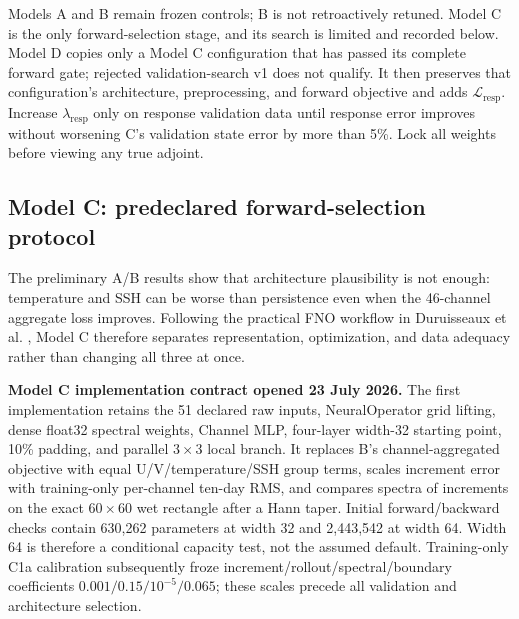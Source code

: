 \documentclass[11pt]{article}
\newenvironment{decisionbox}
  {\begin{center}\begin{lrbox}{\decisionstore}\begin{minipage}{0.92\textwidth}}
  {\end{minipage}\end{lrbox}\setlength{\fboxsep}{8pt}%
   \fcolorbox{teal}{lightteal}{\usebox{\decisionstore}}\end{center}}
\begin{document}
Models A and B remain frozen controls; B is not retroactively retuned.  Model C is the
only forward-selection stage, and its search is limited and recorded below.  Model D
copies only a Model C configuration that has passed its complete forward gate; rejected
validation-search v1 does not qualify.  It then preserves that configuration's
architecture, preprocessing, and forward objective and adds
\(\mathcal{L}_{\mathrm{resp}}\).  Increase \(\lambda_{\mathrm{resp}}\) only on response
validation data until response error improves without worsening C's validation state
error by more than 5\%.  Lock all weights before viewing any true adjoint.

\subsection{Model C: predeclared forward-selection protocol}

The preliminary A/B results show that architecture plausibility is not enough:
temperature and SSH can be worse than persistence even when the 46-channel aggregate
loss improves.  Following the practical FNO workflow in Duruisseaux et al.
\cite{Duruisseaux2026}, Model C therefore separates representation, optimization, and
data adequacy rather than changing all three at once.

\begin{decisionbox}
\textbf{Model C implementation contract opened 23 July 2026.}  The first implementation
retains the 51 declared raw inputs, NeuralOperator grid lifting, dense float32 spectral
weights, Channel MLP, four-layer width-32 starting point, 10\% padding, and parallel
\(3\times3\) local branch.  It replaces B's channel-aggregated objective with equal
U/V/temperature/SSH group terms, scales increment error with training-only per-channel
ten-day RMS, and compares spectra of increments on the exact \(60\times60\) wet
rectangle after a Hann taper.  Initial forward/backward checks contain 630,262
parameters at width 32 and 2,443,542 at width 64.  Width 64 is therefore a conditional
capacity test, not the assumed default.  Training-only C1a calibration subsequently
froze increment/rollout/spectral/boundary coefficients
\(0.001/0.15/10^{-5}/0.065\); these scales precede all validation and architecture
selection.
\end{decisionbox}
\end{document}
